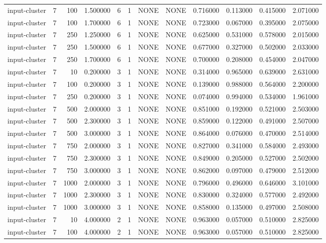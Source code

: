 \begin{tabular}{lrrrllllrrrr}
input-cluster & 7 & 100 & 1.500000 & 6 & 1 & NONE & NONE & 0.716000 & 0.113000 & 0.415000 & 2.071000 \\
input-cluster & 7 & 100 & 1.700000 & 6 & 1 & NONE & NONE & 0.723000 & 0.067000 & 0.395000 & 2.075000 \\
input-cluster & 7 & 250 & 1.250000 & 6 & 1 & NONE & NONE & 0.625000 & 0.531000 & 0.578000 & 2.015000 \\
input-cluster & 7 & 250 & 1.500000 & 6 & 1 & NONE & NONE & 0.677000 & 0.327000 & 0.502000 & 2.033000 \\
input-cluster & 7 & 250 & 1.700000 & 6 & 1 & NONE & NONE & 0.700000 & 0.208000 & 0.454000 & 2.047000 \\
input-cluster & 7 & 10 & 0.200000 & 3 & 1 & NONE & NONE & 0.314000 & 0.965000 & 0.639000 & 2.631000 \\
input-cluster & 7 & 100 & 0.200000 & 3 & 1 & NONE & NONE & 0.139000 & 0.988000 & 0.564000 & 2.200000 \\
input-cluster & 7 & 250 & 0.200000 & 3 & 1 & NONE & NONE & 0.074000 & 0.994000 & 0.534000 & 1.961000 \\
input-cluster & 7 & 500 & 2.000000 & 3 & 1 & NONE & NONE & 0.851000 & 0.192000 & 0.521000 & 2.503000 \\
input-cluster & 7 & 500 & 2.300000 & 3 & 1 & NONE & NONE & 0.859000 & 0.122000 & 0.491000 & 2.507000 \\
input-cluster & 7 & 500 & 3.000000 & 3 & 1 & NONE & NONE & 0.864000 & 0.076000 & 0.470000 & 2.514000 \\
input-cluster & 7 & 750 & 2.000000 & 3 & 1 & NONE & NONE & 0.827000 & 0.341000 & 0.584000 & 2.493000 \\
input-cluster & 7 & 750 & 2.300000 & 3 & 1 & NONE & NONE & 0.849000 & 0.205000 & 0.527000 & 2.502000 \\
input-cluster & 7 & 750 & 3.000000 & 3 & 1 & NONE & NONE & 0.862000 & 0.097000 & 0.479000 & 2.512000 \\
input-cluster & 7 & 1000 & 2.000000 & 3 & 1 & NONE & NONE & 0.796000 & 0.496000 & 0.646000 & 3.101000 \\
input-cluster & 7 & 1000 & 2.300000 & 3 & 1 & NONE & NONE & 0.830000 & 0.324000 & 0.577000 & 2.492000 \\
input-cluster & 7 & 1000 & 3.000000 & 3 & 1 & NONE & NONE & 0.858000 & 0.135000 & 0.497000 & 2.508000 \\
input-cluster & 7 & 10 & 4.000000 & 2 & 1 & NONE & NONE & 0.963000 & 0.057000 & 0.510000 & 2.825000 \\
input-cluster & 7 & 100 & 4.000000 & 2 & 1 & NONE & NONE & 0.963000 & 0.057000 & 0.510000 & 2.825000 \\

\end{tabular}
